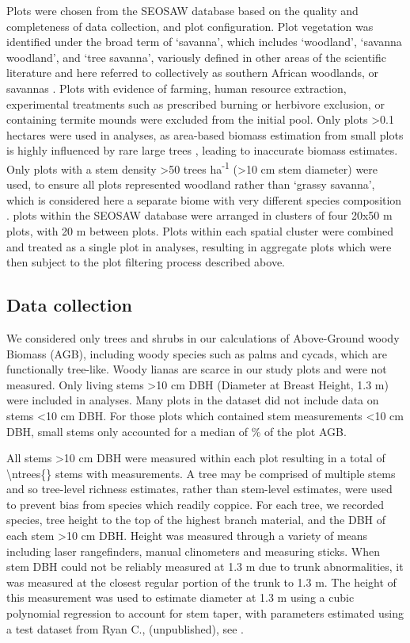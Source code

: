 \documentclass[12pt,a4paper]{article}
\begin{document}
Plots were chosen from the SEOSAW database based on the quality and completeness of data collection, and plot configuration. Plot vegetation was identified under the broad term of `savanna', which includes `woodland', `savanna woodland', and `tree savanna', variously defined in other areas of the scientific literature and here referred to collectively as southern African woodlands, or savannas \citep{Ratnam2011, Hill2010}. Plots with evidence of farming, human resource extraction, experimental treatments such as prescribed burning or herbivore exclusion, or containing termite mounds were excluded from the initial pool. Only plots >0.1 hectares were used in analyses, as area-based biomass estimation from small plots is highly influenced by rare large trees \citep{Stegen2011}, leading to inaccurate biomass estimates. Only plots with a stem density >50 trees ha\textsuperscript{-1} (>10 cm stem diameter) were used, to ensure all plots represented woodland rather than `grassy savanna', which is considered here a separate biome with very different species composition \citep{Parr2014}. \nzam{} plots within the SEOSAW database were arranged in clusters of four 20x50 m plots, with 20 m between plots. Plots within each spatial cluster were combined and treated as a single plot in analyses, resulting in \nzamcluster{} aggregate plots which were then subject to the plot filtering process described above.

\subsection{Data collection}
 
We considered only trees and shrubs in our calculations of Above-Ground woody Biomass (AGB), including woody species such as palms and cycads, which are functionally tree-like. Woody lianas are scarce in our study plots and were not measured. Only living stems >10 cm DBH (Diameter at Breast Height, 1.3 m) were included in analyses. Many plots in the dataset did not include data on stems <10 cm DBH. For those plots which contained stem measurements <10 cm DBH, small stems only accounted for a median of \percsmallagb{}\% of the plot AGB. 

All stems >10 cm DBH were measured within each plot resulting in a total of \num[group-separator={,}]{\ntrees{}} stems with measurements. A tree may be comprised of multiple stems and so tree-level richness estimates, rather than stem-level estimates, were used to prevent bias from species which readily coppice. For each tree, we recorded species, tree height to the top of the highest branch material, and the DBH of each stem >10 cm DBH. Height was measured through a variety of means including laser rangefinders, manual clinometers and measuring sticks. When stem DBH could not be reliably measured at 1.3 m due to trunk abnormalities, it was measured at the closest regular portion of the trunk to 1.3 m. The height of this measurement was used to estimate diameter at 1.3 m using a cubic polynomial regression to account for stem taper, with parameters estimated using a test dataset from Ryan C., (unpublished), see \citet{Godlee2020}. 
\end{document}
